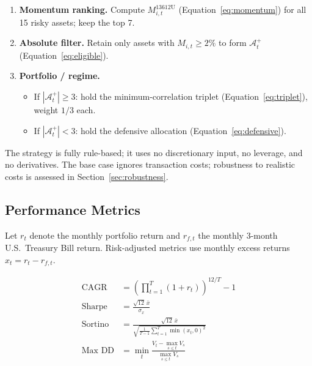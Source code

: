 \begin{enumerate}
    \item \textbf{Momentum ranking.} Compute $M_{i,t}^{\text{13612U}}$
          (Equation~\ref{eq:momentum}) for all 15 risky assets; keep the top 7.
    \item \textbf{Absolute filter.} Retain only assets with $M_{i,t} \geq 2\%$ to
          form $\mathcal{A}_t^+$ (Equation~\ref{eq:eligible}).
    \item \textbf{Portfolio / regime.}
          \begin{itemize}
              \item If $|\mathcal{A}_t^+| \geq 3$: hold the minimum-correlation
                    triplet (Equation~\ref{eq:triplet}), weight $1/3$ each.
              \item If $|\mathcal{A}_t^+| < 3$: hold the defensive allocation
                    (Equation~\ref{eq:defensive}).
          \end{itemize}
\end{enumerate}

The strategy is fully rule-based; it uses no discretionary input, no leverage, and
no derivatives. The base case ignores transaction costs; robustness to realistic
costs is assessed in Section~\ref{sec:robustness}.

\subsection{Performance Metrics}
\label{sec:metrics}

Let $r_t$ denote the monthly portfolio return and $r_{f,t}$ the monthly 3-month
U.S.\ Treasury Bill return. Risk-adjusted metrics use monthly excess returns
$x_t = r_t - r_{f,t}$.

\begin{align}
\text{CAGR} &= \left(\prod_{t=1}^{T}(1 + r_t)\right)^{12/T} - 1 \label{eq:cagr} \\[4pt]
\text{Sharpe} &= \frac{\sqrt{12}\,\bar{x}}{\sigma_x} \label{eq:sharpe} \\[4pt]
\text{Sortino} &= \frac{\sqrt{12}\,\bar{x}}{\sqrt{\frac{1}{T-1}\sum_{t=1}^{T}\min(x_t,0)^2}} \label{eq:sortino} \\[4pt]
\text{Max DD} &= \min_{t} \frac{V_t - \max_{s \leq t} V_s}{\max_{s \leq t} V_s} \label{eq:maxdd}
\end{align}

